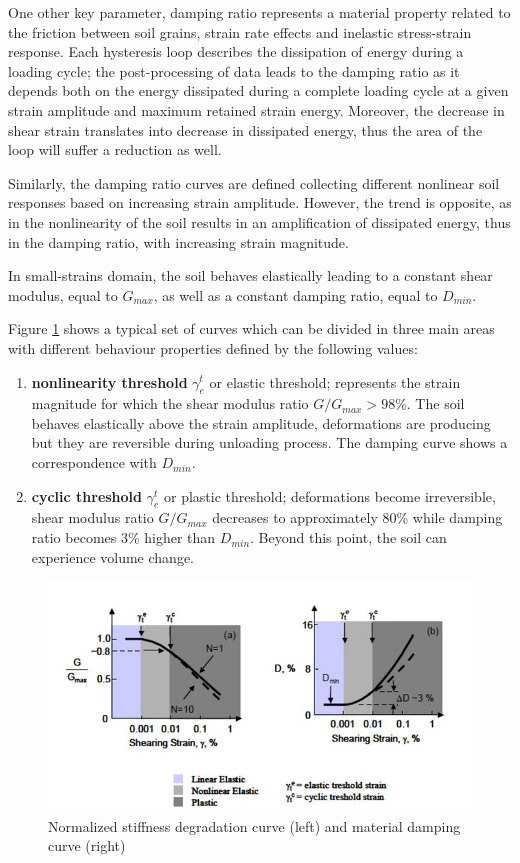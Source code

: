 \documentclass[12pt,a4paper]{report}
\begin{document}
One other key parameter, damping ratio represents a material property related to the friction between soil grains, strain rate effects and inelastic stress-strain response. Each hysteresis loop describes the dissipation of energy during a loading cycle; the post-processing of data leads to the damping ratio as it depends both on the energy dissipated during a complete loading cycle at a given strain amplitude and maximum retained strain energy. Moreover, the decrease in shear strain translates into decrease in dissipated energy, thus the area of the loop will suffer a reduction as well. 

Similarly, the damping ratio curves are defined collecting different nonlinear soil responses based on increasing strain amplitude. However, the trend is opposite, as in the nonlinearity of the soil results in an amplification of dissipated energy, thus in the damping ratio,  with increasing strain magnitude. 

In small-strains domain, the soil behaves elastically leading to a constant shear modulus, equal to $G_{max}$, as well as a constant damping ratio, equal to $D_{min}$.

Figure \ref{normalized} shows a typical set of curves which can be divided in three main areas with different behaviour properties defined by the following values:
\begin{enumerate}
	\item \textbf{nonlinearity threshold} $\gamma_e^t$ or elastic threshold; represents the strain magnitude for which the shear modulus ratio $G/G_{max}>98\%$. The soil behaves elastically above the strain amplitude, deformations are producing but they are reversible during unloading process. The damping curve shows a correspondence with $D_{min}$. 
	\item \textbf{cyclic threshold} $\gamma_e^t$ or plastic threshold; deformations become irreversible, shear modulus ratio $G/G_{max}$ decreases to approximately 80\% while damping ratio becomes 3\% higher than $D_{min}$. Beyond this point, the soil can experience volume change. 
\end{enumerate}

\begin{figure}[h!]
	\centering
	\includegraphics[width=0.8\linewidth]{"normalized"}
	\caption{Normalized stiffness degradation curve (left) and material damping curve (right)}
	\label{normalized}
\end{figure}
\end{document}
